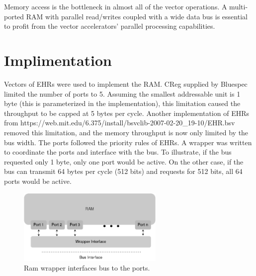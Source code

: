 \begin{paper}
\renewcommand*{\pagemark}{}

\section*{}
Memory access is the bottleneck in almost all of the vector operations. A multi-ported RAM with parallel read/writes coupled with a wide data bus is essential to profit from the vector accelerators' parallel processing capabilities.
\section*{Implimentation\sdot}
Vectors of EHRs were used to implement the RAM. CReg supplied by Bluespec limited the number of ports to 5. Assuming the smallest addressable unit is 1 byte (this is parameterized in the implementation), this limitation caused the throughput to be capped at 5 bytes per cycle. Another implementation of EHRs from {\color{RubineRed} https://web.mit.edu/6.375/install/bsvclib-2007-02-20\_19-10/EHR.bsv} removed this limitation, and the memory throughput is now only limited by the bus width. The ports followed the priority rules of EHRs. A wrapper was written to coordinate the ports and interface with the bus. To illustrate, if the bus requested only 1 byte, only one port would be active. On the other case, if the bus can transmit 64 bytes per cycle (512 bits) and requests for 512 bits, all 64 ports would be active.
\begin{figure}[H]
\centering
\includegraphics[width=7cm]{Images/Overview-Ram.png}
\caption{\content Ram wrapper interfaces bus to the ports.}
\end{figure}
\end{paper}